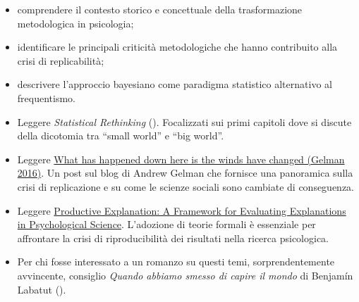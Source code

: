 \documentclass[
  letterpaper,
]{krantz}
\providecommand{\tightlist}{%
  \setlength{\itemsep}{0pt}\setlength{\parskip}{0pt}}\usepackage{longtable,booktabs,array}
\begin{document}
\begin{tcolorbox}[enhanced jigsaw, toprule=.15mm, breakable, bottomrule=.15mm, colback=white, colbacktitle=quarto-callout-important-color!10!white, left=2mm, toptitle=1mm, colframe=quarto-callout-important-color-frame, coltitle=black, opacitybacktitle=0.6, bottomtitle=1mm, titlerule=0mm, leftrule=.75mm, opacityback=0, rightrule=.15mm, title=\textcolor{quarto-callout-important-color}{\faExclamation}\hspace{0.5em}{In questo capitolo imparerai a}, arc=.35mm]

\begin{itemize}
\tightlist
\item
  comprendere il contesto storico e concettuale della trasformazione
  metodologica in psicologia;
\item
  identificare le principali criticità metodologiche che hanno
  contribuito alla crisi di replicabilità;
\item
  descrivere l'approccio bayesiano come paradigma statistico alternativo
  al frequentismo.
\end{itemize}

\end{tcolorbox}

\begin{tcolorbox}[enhanced jigsaw, toprule=.15mm, breakable, bottomrule=.15mm, colback=white, colbacktitle=quarto-callout-tip-color!10!white, left=2mm, toptitle=1mm, colframe=quarto-callout-tip-color-frame, coltitle=black, opacitybacktitle=0.6, bottomtitle=1mm, titlerule=0mm, leftrule=.75mm, opacityback=0, rightrule=.15mm, title=\textcolor{quarto-callout-tip-color}{\faLightbulb}\hspace{0.5em}{Prerequisiti}, arc=.35mm]

\begin{itemize}
\tightlist
\item
  Leggere \emph{Statistical Rethinking}
  (). Focalizzati
  sui primi capitoli dove si discute della dicotomia tra ``small world''
  e ``big world''.
\item
  Leggere
  \href{https://statmodeling.stat.columbia.edu/2016/09/21/what-has-happened-down-here-is-the-winds-have-changed/}{What
  has happened down here is the winds have changed (Gelman 2016)}. Un
  post sul blog di Andrew Gelman che fornisce una panoramica sulla crisi
  di replicazione e su come le scienze sociali sono cambiate di
  conseguenza.
\item
  Leggere
  \href{https://psycnet.apa.org/fulltext/2025-04988-001.html}{Productive
  Explanation: A Framework for Evaluating Explanations in Psychological
  Science}. L'adozione di teorie formali è essenziale per affrontare la
  crisi di riproducibilità dei risultati nella ricerca psicologica.
\item
  Per chi fosse interessato a un romanzo su questi temi,
  sorprendentemente avvincente, consiglio \emph{Quando abbiamo smesso di
  capire il mondo} di Benjamín Labatut
  ().
\end{itemize}

\end{tcolorbox}
\end{document}
